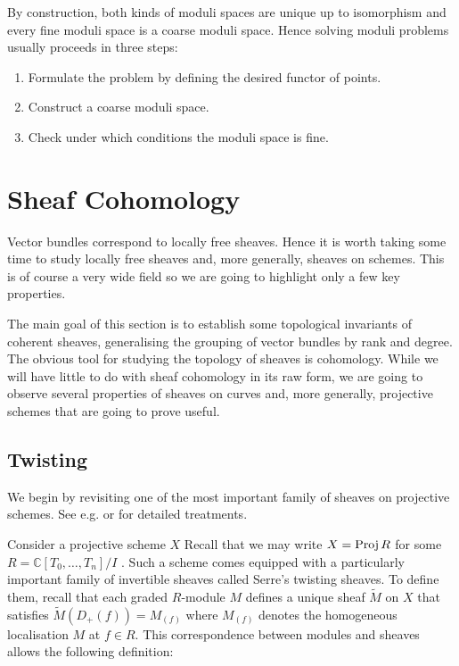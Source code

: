 \documentclass[12pt]{ociamthesis}  %
\begin{document}
By construction, both kinds of moduli spaces are unique up to
isomorphism and every fine moduli space is a coarse moduli
space. Hence solving moduli problems usually proceeds in
three steps:

\begin{enumerate}
  \item Formulate the problem by defining the desired functor of
    points.
  \item Construct a coarse moduli space.
  \item Check under which conditions the moduli space is fine.
\end{enumerate}

\section{Sheaf Cohomology}

Vector bundles correspond to locally free sheaves. Hence it is worth
taking some time to study locally free sheaves and, more generally,
sheaves on schemes. This is of course a very wide field
so we are going to highlight only a few key properties.

The main goal of this section is to establish some topological
invariants of coherent sheaves, generalising the grouping of
vector bundles by rank and degree. The obvious tool for studying
the topology of sheaves is cohomology. While we will have little
to do with sheaf cohomology in its raw form, we are going to
observe several properties of sheaves on curves and, more generally,
projective schemes that are going to prove useful.

\subsection{Twisting}

We begin by revisiting one of the most important family of sheaves
on projective schemes. See e.g. \cite{gortz2010} or
\cite{hartshorne1977} for detailed treatments.

Consider a projective scheme $X$ Recall that we may write
$X=\operatorname{Proj} R$ for some $R=\mathbb{C}[T_0,\ldots,T_n]/I$ \cite[II Corollary 5.16]{hartshorne1977}. Such a scheme comes
equipped with a particularly important family of invertible sheaves
called Serre's twisting sheaves. To define them, recall that each
graded $R$-module $M$ defines a unique sheaf $\tilde M$ on $X$
that satisfies $\tilde M (D_+(f)) = M_{(f)}$ where $M_{(f)}$
denotes the homogeneous localisation $M$ at $f\in R$. This
correspondence between modules and sheaves allows the following
definition:
\end{document}
